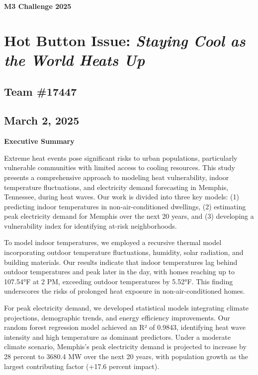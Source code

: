 \documentclass{article}
\begin{document}
\thispagestyle{empty}
\pagestyle{fancy}
\fancyhead{}
\fancyfoot{}
\renewcommand{\headrulewidth}{0pt}

\begin{center}

\Huge{\textbf{M3 Challenge 2025}}
\section*{Hot Button Issue: \textit{Staying Cool as the World Heats Up}}

\subsection*{Team \#17447}
\subsection*{March 2, 2025}
\end{center}

\clearpage

\begin{center}
    \Huge \textbf{Executive Summary}
\end{center}
Extreme heat events pose significant risks to urban populations, particularly vulnerable communities with limited access to cooling resources. This study presents a comprehensive approach to modeling heat vulnerability, indoor temperature fluctuations, and electricity demand forecasting in Memphis, Tennessee, during heat waves. Our work is divided into three key models: (1) predicting indoor temperatures in non-air-conditioned dwellings, (2) estimating peak electricity demand for Memphis over the next 20 years, and (3) developing a vulnerability index for identifying at-risk neighborhoods.

To model indoor temperatures, we employed a recursive thermal model incorporating outdoor temperature fluctuations, humidity, solar radiation, and building materials. Our results indicate that indoor temperatures lag behind outdoor temperatures and peak later in the day, with homes reaching up to 107.54°F at 2 PM, exceeding outdoor temperatures by 5.52°F. This finding underscores the risks of prolonged heat exposure in non-air-conditioned homes.

For peak electricity demand, we developed statistical models integrating climate projections, demographic trends, and energy efficiency improvements. Our random forest regression model achieved an R² of 0.9843, identifying heat wave intensity and high temperature as dominant predictors. Under a moderate climate scenario, Memphis's peak electricity demand is projected to increase by 28 percent to 3680.4 MW over the next 20 years, with population growth as the largest contributing factor (+17.6 percent impact).
\end{document}
